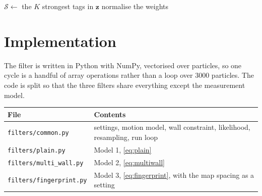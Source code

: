 \documentclass[11pt,a4paper]{article}
\begin{document}
\begin{algorithm}[H]
  \caption{One cycle of the BLE particle filter (one scan per second)}
  \label{alg:pf}
  $\mathcal{S} \leftarrow$ the $K$ strongest tags in $\mathbf{z}$\;
  normalise the weights\;
\end{algorithm}

\section{Implementation}
\label{sec:implementation}

The filter is written in Python with NumPy, vectorised over particles, so one cycle is a
handful of array operations rather than a loop over 3000 particles. The code is split so
that the three filters share everything except the measurement model.

\begin{center}
\small
\begin{tabular}{@{}ll@{}}
\toprule
File & Contents \\
\midrule
\texttt{filters/common.py} & settings, motion model, wall constraint, likelihood, resampling, run loop\\
\texttt{filters/plain.py} & Model 1, \cref{eq:plain}\\
\texttt{filters/multi\_wall.py} & Model 2, \cref{eq:multiwall}\\
\texttt{filters/fingerprint.py} & Model 3, \cref{eq:fingerprint}, with the map spacing as a setting\\
\bottomrule
\end{tabular}
\end{center}
\end{document}
